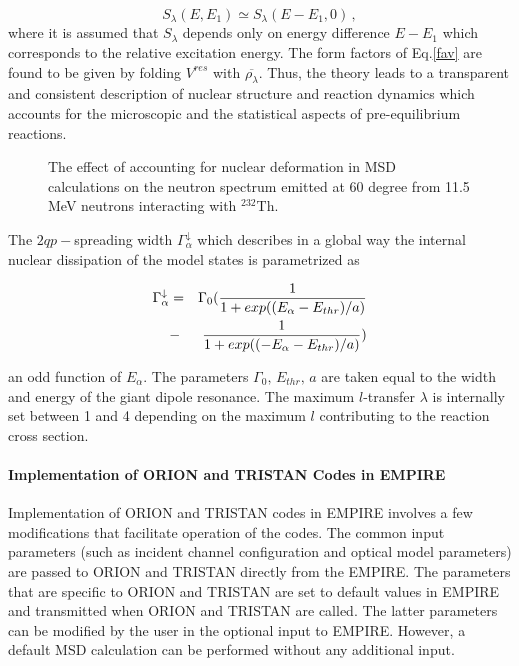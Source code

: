 \begin{equation}
S_{\lambda}(E,E_{1})\simeq S_{\lambda}(E-E_{1},0)\,,  \label{slrpa}
\end{equation}
\noindent where it is assumed that $S_{\lambda}$ depends only on energy
difference $E-E_{1}$ which corresponds to the relative excitation energy.
The form factors of Eq.\ref{fav} are found to be given by folding $V^{res}$
with $%
\overline{\rho_{\lambda}}$. Thus, the theory leads to a transparent and
consistent description of nuclear structure and reaction dynamics which
accounts for the microscopic and the statistical aspects of pre-equilibrium
reactions.

\begin{figure}[htbp]
\caption{The effect of accounting for nuclear deformation in MSD
calculations on the neutron spectrum emitted at 60 degree from 11.5 MeV
neutrons interacting with $^{232}$Th.}
\label{fig:Th-defMSD}
\end{figure}

The $2qp-$spreading width $\Gamma_{\alpha}^{\downarrow}$ which describes in
a global way the internal nuclear dissipation of the model states is
parametrized as

\begin{eqnarray}
\Gamma_{\alpha}^{\downarrow}&=&\Gamma_{0}(\frac{1}{1+exp((E_{%
\alpha}-E_{thr})/a)}  \notag \\
&-&\frac{1}{1+exp((-E_{\alpha}-E_{thr})/a)})
\end{eqnarray}

\noindent an odd function of $E_{\alpha}$. The parameters $\Gamma_{0},\,
E_{thr},\, a$ are taken equal to the width and energy of the giant dipole
resonance. The maximum $l$-transfer $\lambda$ is internally set between 1
and 4 depending on the maximum $l$ contributing to the reaction cross
section.

\medskip

\paragraph{Implementation of ORION and TRISTAN%
 Codes in EMPIRE}

Implementation of ORION%
 and TRISTAN codes in EMPIRE involves a few modifications that
facilitate operation of the codes. The common input parameters (such as
incident channel configuration and optical model parameters) are passed to
ORION and TRISTAN directly from the EMPIRE. The parameters that are specific
to ORION and TRISTAN are set to default values in EMPIRE and transmitted
when ORION and TRISTAN are called. The latter parameters can be modified by
the user in the optional input to EMPIRE. However, a default MSD%
 calculation can be performed without any additional input.

